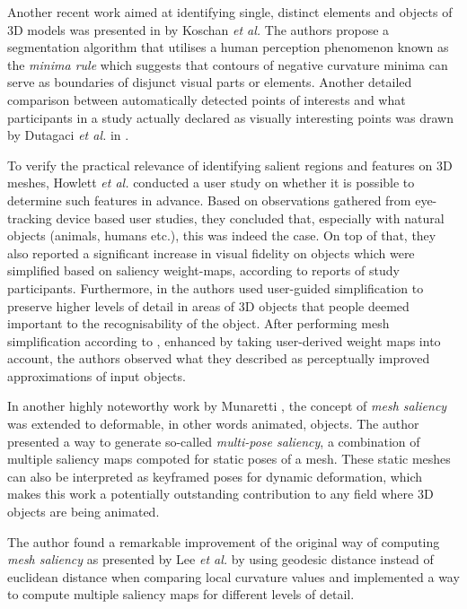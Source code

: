 Another recent work aimed at identifying single, distinct elements and objects of 3D models was presented in \cite{koschan2003perception} by Koschan \textit{et al.} The authors propose a segmentation algorithm that utilises a human perception phenomenon known as the \textit{minima rule} which suggests that contours of negative curvature minima can serve as boundaries of disjunct visual parts or elements. Another detailed comparison between automatically detected points of interests and what participants in a study actually declared as visually interesting points was drawn by Dutagaci \textit{et al.} in \cite{dutagaci2012evaluation}.

To verify the practical relevance of identifying salient regions and features on 3D meshes, Howlett \textit{et al.} \cite{howlett2005predicting} conducted a user study on whether it is possible to determine such features in advance. Based on observations gathered from eye-tracking device based user studies, they concluded that, especially with natural objects (animals, humans etc.), this was indeed the case. On top of that, they also reported a significant increase in visual fidelity on objects which were simplified based on saliency weight-maps, according to reports of study participants. Furthermore, in \cite{kho2003user} the authors used user-guided simplification to preserve higher levels of detail in areas of 3D objects that people deemed important to the recognisability of the object. After performing mesh simplification according to \cite{garland1997qslim}, enhanced by taking user-derived weight maps into account, the authors observed what they described as perceptually improved approximations of input objects.

In another highly noteworthy work by Munaretti \cite{munaretti2007perceptual}, the concept of \textit{mesh saliency} was extended to deformable, in other words animated, objects. The author presented a way to generate so-called \textit{multi-pose saliency}, a combination of multiple saliency maps compoted for static poses of a mesh. These static meshes can also be interpreted as keyframed poses for dynamic deformation, which makes this work a potentially outstanding contribution to any field where 3D objects are being animated.

The author found a remarkable improvement of the original way of computing \textit{mesh saliency} as presented by Lee \textit{et al.} by using geodesic distance \cite{surazhsky2005fast} instead of euclidean distance when comparing local curvature values and implemented a way to compute multiple saliency maps for different levels of detail.

